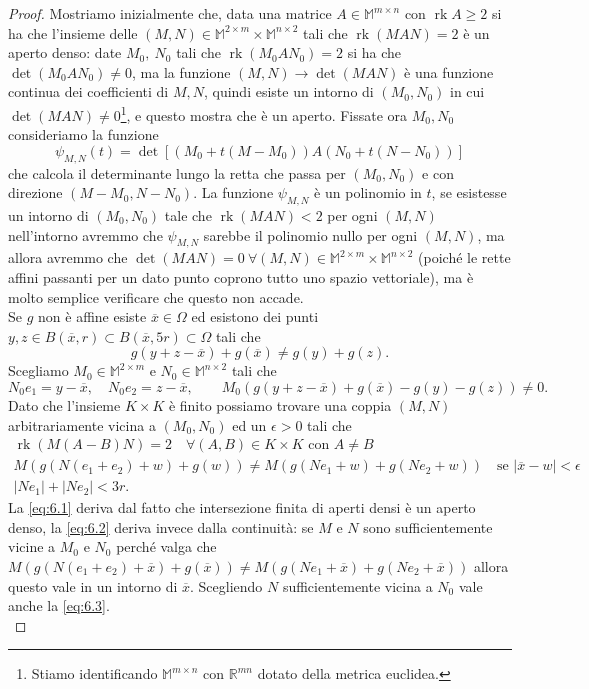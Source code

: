 \documentclass[a4paper,11pt]{book}
\theoremstyle{plain}
\theoremstyle{definition}
\theoremstyle{remark}
\newcommand{\R}{\mathbb{R}}
\newcommand{\M}{\mathbb{M}}
\DeclareMathOperator{\rk}{rk}
\begin{document}
\begin{proof}
	Mostriamo inizialmente che, data una matrice $A\in \M^{m\times n}$ con $\rk A\geq 2$ si ha che l'insieme delle $(M,N)\in \M^{2\times m}\times \M^{n\times 2}$ tali che $\rk(MAN)=2$ è un aperto denso: date $M_0,\ N_0$ tali che $\rk(M_0AN_0) = 2$ si ha che $\det(M_0AN_0) \neq 0$, ma la funzione $(M,N)\to\det(MAN)$ è una funzione continua dei coefficienti di $M,N$, quindi esiste un intorno di $(M_0,N_0)$ in cui $\det(MAN)\neq 0$\footnote{Stiamo identificando $\M^{m\times n}$ con $\R^{mn}$ dotato della metrica euclidea.}, e questo mostra che è un aperto. Fissate ora $M_0,N_0$ consideriamo la funzione
	\[
		\psi_{M,N}(t)=\det\left[(M_0+t(M-M_0))A(N_0+t(N-N_0))\right]
	\]
	che calcola il determinante lungo la retta che passa per $(M_0,N_0)$ e con direzione $(M-M_0,N-N_0)$. La funzione $\psi_{M,N}$ è un polinomio in $t$, se esistesse un intorno di $(M_0,N_0)$ tale che $\rk(MAN)<2$ per ogni $(M,N)$ nell'intorno avremmo che $\psi_{M,N}$ sarebbe il polinomio nullo per ogni $(M,N)$, ma allora avremmo che $\det(MAN) = 0\ \forall (M,N)\in \M^{2\times m}\times \M^{n\times 2}$ (poiché le rette affini passanti per un dato punto coprono tutto uno spazio vettoriale), ma è molto semplice verificare che questo non accade.\\
	Se $g$ non è affine esiste $\overline{x}\in \Omega$ ed esistono dei punti $y,z\in B(\overline{x},r)\subset B(\overline{x},5r)\subset \Omega$ tali che
	\[
		g(y+z-\overline{x})+g(\overline{x})\neq g(y)+g(z).
	\]
	Scegliamo $M_0\in \M^{2\times m}$ e $N_0\in \M^{n\times 2}$ tali che
	\[
		N_0e_1 = y-\overline{x},\quad N_0e_2=z-\overline{x},\qquad M_0(g(y+z-\overline{x})+g(\overline{x})-g(y)-g(z))\neq 0.
	\]
	Dato che l'insieme $K\times K$ è finito possiamo trovare una coppia $(M,N)$ arbitrariamente vicina a $(M_0,N_0)$ ed un $\epsilon>0$ tali che
	\begin{gather}
		\rk(M(A-B)N) = 2\quad\forall (A,B)\in K\times K\text{ con }A\neq B\label{eq:6.1}\\
		M(g(N(e_1+e_2)+w)+g(w)) \neq M(g(Ne_1+w)+g(Ne_2+w))\quad\text{se }|\overline{x}-w|<\epsilon\label{eq:6.2}\\
		|Ne_1|+|Ne_2| < 3r.\label{eq:6.3}
	\end{gather}
	La \eqref{eq:6.1} deriva dal fatto che intersezione finita di aperti densi è un aperto denso, la \eqref{eq:6.2} deriva invece dalla continuità: se $M$ e $N$ sono sufficientemente vicine a $M_0$ e $N_0$ perché valga che $M(g(N(e_1+e_2)+\overline{x})+g(\overline{x})) \neq M(g(Ne_1+\overline{x})+g(Ne_2+\overline{x}))$ allora questo vale in un intorno di $\overline{x}$. Scegliendo $N$ sufficientemente vicina a $N_0$ vale anche la \eqref{eq:6.3}.\\

\end{proof}
\end{document}
